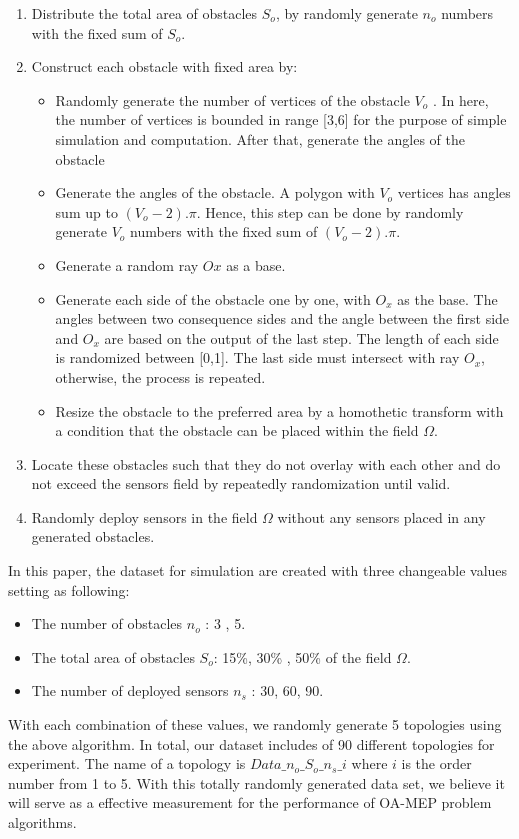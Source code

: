\documentclass[final]{elsarticle}
\begin{document}
\begin{enumerate}
	\item Distribute the total area of obstacles $S_o$, by randomly generate $n_o$ numbers with the fixed sum of $S_o$.
	\item Construct each obstacle with fixed area by:
	\begin{itemize}
		\item Randomly generate the number of vertices of the obstacle $V_o$ . In here, the number of vertices is bounded in range [3,6] for the purpose of simple simulation and computation. After that, generate the angles of the obstacle 
		\item Generate the angles of the obstacle. A polygon with $V_o$ vertices has angles sum up to $(V_o - 2).\pi$. Hence, this step can be done by randomly generate $V_o$ numbers with the fixed sum of $(V_o - 2).\pi$.
		\item Generate a random ray $Ox$ as a base.
		\item Generate each side of the obstacle one by one, with $O_x$ as the base. The angles between two consequence sides and the angle between the first side and $O_x$ are based on the output of the last step. The length of each side is randomized between [0,1]. The last side must intersect with ray $O_x$, otherwise, the process is repeated.
		\item Resize the obstacle to the preferred area by a homothetic transform with a condition that the obstacle can be placed within the field $\Omega$.
	\end{itemize}
	\item Locate these obstacles such that they do not overlay with each other and do not exceed the sensors field by repeatedly randomization until valid.
	\item Randomly deploy sensors in the field $\Omega$ without any sensors placed in any generated obstacles.
\end{enumerate}

In this paper, the dataset for simulation are created with three changeable values setting as following:
\begin{itemize}
	\item The number of obstacles $n_o$ : 3 , 5.
	\item The total area of obstacles $S_o$: 15\%, 30\% , 50\% of the field $\Omega$.
	\item The number of deployed sensors $n_s$ : 30, 60, 90.
\end{itemize}
With each combination of these values, we randomly generate 5 topologies using the above algorithm. In total, our dataset includes of 90 different topologies for experiment. The name of a topology is $Data\_n_o\_S_o\_n_s\_i$ where $ i $ is the order number from 1 to 5. With this totally randomly generated data set, we believe it will serve as a effective measurement for the performance of OA-MEP problem algorithms. 
\end{document}
